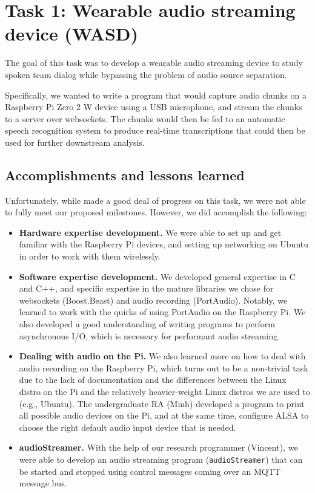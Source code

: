 \section{Task 1: Wearable audio streaming device (WASD)}

The goal of this task was to develop a wearable audio streaming device to
study spoken team dialog while bypassing the problem of audio source
separation.

Specifically, we wanted to write a program that would capture audio chunks on a
Raspberry Pi Zero 2 W device using a USB microphone, and stream the chunks to a
server over websockets. The chunks would then be fed to an automatic speech
recognition system to produce real-time transcriptions that could then be used
for further downstream analysis.

\subsection{Accomplishments and lessons learned}

Unfortunately, while made a good deal of progress on this task, we were not
able to fully meet our proposed milestones. However, we did accomplish the
following:


\begin{itemize}

    \item \textbf{Hardware expertise development.} We were able to set up and
        get familiar with the Raspberry Pi devices, and setting up networking
        on Ubuntu in order to work with them wirelessly.

    \item \textbf{Software expertise development.} We developed general
        expertise in C and C++, and specific expertise in the mature libraries
        we chose for websockets (Boost.Beast) and audio recording (PortAudio).
        Notably, we learned to work with the quirks of using PortAudio on the
        Raspberry Pi.  We also developed a good understanding of writing
        programs to perform asynchronous I/O, which is necessary for performant
        audio streaming.

    \item \textbf{Dealing with audio on the Pi.} We also learned more on how to
        deal with audio recording on the Raspberry Pi, which turns out to be a
        non-trivial task due to the lack of documentation and the differences
        between the Linux distro on the Pi and the relatively heavier-weight
        Linux distros we are used to (e.g., Ubuntu).
        The undergraduate RA (Minh) developed a program to print all possible audio
        devices on the Pi, and at the same time, configure ALSA to choose the
        right default audio input device that is needed.

    \item \textbf{audioStreamer.} With the help of our research programmer
        (Vincent), we were able to develop an audio streaming program
        (\texttt{audioStreamer}) that can be started and stopped using control
        messages coming over an MQTT message bus. 

\end{itemize}

